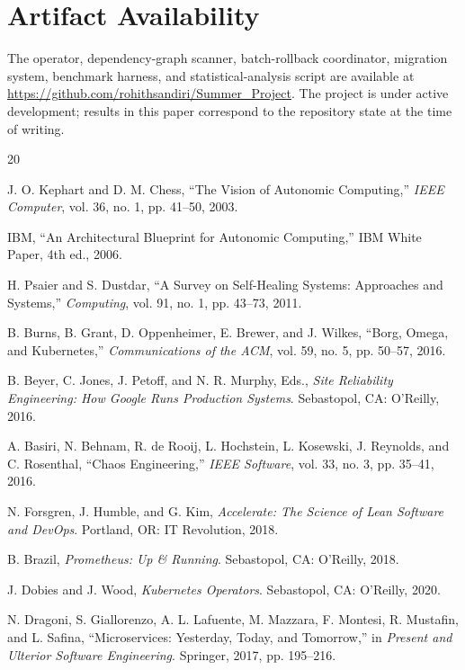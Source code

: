 \documentclass[conference]{IEEEtran}
\begin{document}
\section*{Artifact Availability}
The operator, dependency-graph scanner, batch-rollback coordinator, migration system, benchmark harness, and statistical-analysis script are available at \url{https://github.com/rohithsandiri/Summer_Project}. The project is under active development; results in this paper correspond to the repository state at the time of writing.

\begin{thebibliography}{20}

 J. O. Kephart and D. M. Chess, ``The Vision of Autonomic Computing,'' \emph{IEEE Computer}, vol. 36, no. 1, pp. 41--50, 2003.

 IBM, ``An Architectural Blueprint for Autonomic Computing,'' IBM White Paper, 4th ed., 2006.

 H. Psaier and S. Dustdar, ``A Survey on Self-Healing Systems: Approaches and Systems,'' \emph{Computing}, vol. 91, no. 1, pp. 43--73, 2011.

 B. Burns, B. Grant, D. Oppenheimer, E. Brewer, and J. Wilkes, ``Borg, Omega, and Kubernetes,'' \emph{Communications of the ACM}, vol. 59, no. 5, pp. 50--57, 2016.

 B. Beyer, C. Jones, J. Petoff, and N. R. Murphy, Eds., \emph{Site Reliability Engineering: How Google Runs Production Systems}. Sebastopol, CA: O'Reilly, 2016.

 A. Basiri, N. Behnam, R. de Rooij, L. Hochstein, L. Kosewski, J. Reynolds, and C. Rosenthal, ``Chaos Engineering,'' \emph{IEEE Software}, vol. 33, no. 3, pp. 35--41, 2016.

 N. Forsgren, J. Humble, and G. Kim, \emph{Accelerate: The Science of Lean Software and DevOps}. Portland, OR: IT Revolution, 2018.

 B. Brazil, \emph{Prometheus: Up \& Running}. Sebastopol, CA: O'Reilly, 2018.

 J. Dobies and J. Wood, \emph{Kubernetes Operators}. Sebastopol, CA: O'Reilly, 2020.

 N. Dragoni, S. Giallorenzo, A. L. Lafuente, M. Mazzara, F. Montesi, R. Mustafin, and L. Safina, ``Microservices: Yesterday, Today, and Tomorrow,'' in \emph{Present and Ulterior Software Engineering}. Springer, 2017, pp. 195--216.


\end{thebibliography}
\end{document}
